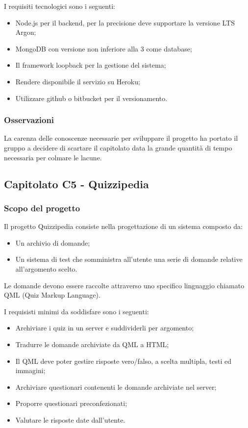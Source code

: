 I  requisiti tecnologici sono i seguenti:
\begin{itemize}
	\item Node.js per il backend, per la precisione deve supportare la versione LTS Argon;
	\item MongoDB con versione non inferiore alla 3 come database;
	\item Il framework loopback per la gestione del sistema;
	\item Rendere disponibile il servizio su Heroku;
	\item Utilizzare github o bitbucket per il versionamento.
\end{itemize}

\subsubsection{Osservazioni}
La carenza delle conoscenze necessarie per sviluppare il progetto ha portato il gruppo a decidere di scartare il capitolato data la grande quantità
di tempo necessaria per colmare le lacune.


\subsection{Capitolato C5 - Quizzipedia}
\subsubsection{Scopo del progetto}

Il progetto Quizzipedia consiste nella progettazione di un sistema composto da:
\begin{itemize}
	\item Un archivio di domande;
	\item Un sistema di test che somministra all'utente una serie di domande relative all'argomento scelto.
\end{itemize}
Le domande devono essere raccolte attraverso uno specifico linguaggio chiamato QML (Quiz Markup Language).

I requisisti minimi da soddisfare sono i seguenti:
\begin{itemize}
	\item Archiviare i quiz in un server e suddividerli per argomento;
	\item Tradurre le domande archiviate da QML a HTML;
	\item Il QML deve poter gestire risposte vero/falso, a scelta multipla, testi ed immagini;
	\item Archiviare questionari contenenti le domande archiviate nel server;
	\item Proporre questionari preconfezionati;
	\item Valutare le risposte date dall'utente.
\end{itemize}

